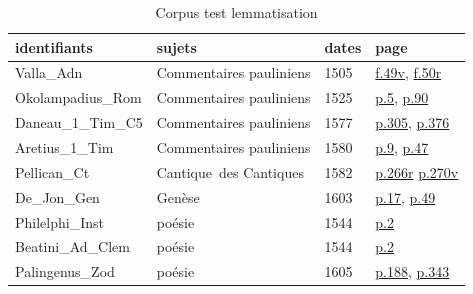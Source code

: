 \begin{table}[htbp]
    \small
    \centering
    \begin{tabularx}{\linewidth}{l|p{1.7cm}|X|X}
        \toprule
        \textbf{identifiants} & \textbf{sujets} & \textbf{dates} & \textbf{page} \\
        \midrule
         Valla\_Adn & Commentaires pauliniens & 1505 & \href{https://api.digitale-sammlungen.de/iiif/image/v2/bsb11059298_00082/full/1134,/0/default.jpg}{f.49v}, \href{https://api.digitale-sammlungen.de/iiif/image/v2/bsb11059298_00083/full/1134,/0/default.jpg}{f.50r} \\
        Okolampadius\_Rom & Commentaires pauliniens & 1525 & \href{https://www.e-rara.ch/download/webcache/1000/2122892}{p.5}, \href{https://www.e-rara.ch/download/webcache/1000/2123062}{p.90}\\
        Daneau\_1\_Tim\_C5& Commentaires pauliniens & 1577 & \href{https://www.e-rara.ch/download/webcache/1000/2013217}{p.305}, \href{https://www.e-rara.ch/download/webcache/1000/2013288}{p.376}\\
        Aretius\_1\_Tim & Commentaires pauliniens & 1580 & \href{https://www.e-rara.ch/download/webcache/1000/6289349}{p.9}, \href{https://www.e-rara.ch/download/webcache/1000/6289387}{p.47}\\
        \midrule
        Pellican\_Ct & Cantique~des Cantiques & 1582 & \href{https://www.e-rara.ch/download/webcache/1000/8471143}{p.266r} \href{https://www.e-rara.ch/download/webcache/1000/8471152}{p.270v} \\
        De\_Jon\_Gen & Genèse & 1603 & \href{https://www.e-rara.ch/download/webcache/1000/21301625}{p.17}, \href{https://www.e-rara.ch/download/webcache/1000/21301657}{p.49} \\
        \midrule
        Philelphi\_Inst & poésie & 1544 & \href{https://www.e-rara.ch/download/webcache/1000/2207608}{p.2}\\
        Beatini\_Ad\_Clem & poésie & 1544 & \href{https://www.e-rara.ch/download/webcache/1000/2207529}{p.2}\\
        Palingenus\_Zod & poésie & 1605 & \href{https://www.e-rara.ch/download/webcache/1000/13982576}{p.188}, \href{https://www.e-rara.ch/download/webcache/1000/13982731}{p.343}\\
        \bottomrule
    \end{tabularx}
    \caption{Corpus test lemmatisation }
\end{table}


